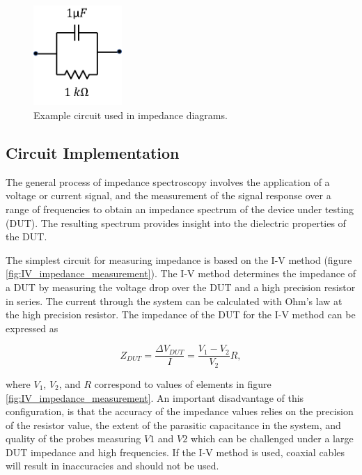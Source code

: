 \begin{figure}[t]
    \centering
    \includegraphics[width=0.3\textwidth]{images/exampleCircuit.png}
    \caption{Example circuit used in impedance diagrams.}
    \label{fig:example_circuit}
\end{figure} 
\newpage 

 \subsection*{Circuit Implementation}
 \label{sec:Circuit Implementation}

 \par The general process of impedance spectroscopy involves the application of a voltage or current signal, and the measurement of the signal response over a range of frequencies to obtain an impedance spectrum of the device under testing (DUT). The resulting spectrum provides insight into the dielectric properties of the DUT. 
 
 \par The simplest circuit for measuring impedance is based on the I-V method (figure \ref{fig:IV_impedance_measurement}). The I-V method determines the impedance of a DUT by measuring the voltage drop over the DUT and a high precision resistor in series. The current through the system can be calculated with Ohm's law at the high precision resistor. The impedance of the DUT for the I-V method can be expressed as 
 
 \begin{equation}
     Z_{DUT} = \frac{\Delta V_{DUT}}{I} = \frac{V_1 - V_2}{V_2}R,
     \label{eqn:IV_Z}
 \end{equation}
 
 \noindent where $V_1$, $V_2$, and $R$ correspond to values of elements in figure \ref{fig:IV_impedance_measurement}. An important disadvantage of this configuration, is that the accuracy of the impedance values relies on the precision of the resistor value, the extent of the parasitic capacitance in the system, and quality of the probes measuring $V1$ and $V2$ which can be challenged under a large DUT impedance and high frequencies. If the I-V method is used, coaxial cables will result in inaccuracies and should not be used.
 
